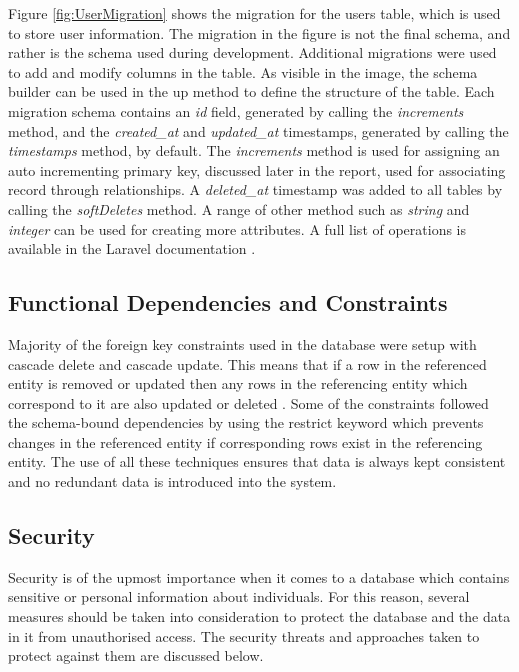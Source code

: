 Figure \ref{fig:UserMigration} shows the migration for the users table, which is used to store user information. The migration in the figure is not the final schema, and rather is the schema used during development. Additional migrations were used to add and modify columns in the table. As visible in the image, the schema builder can be used in the up method to define the structure of the table. Each migration schema contains an \emph{id} field, generated by calling the \emph{increments} method, and the \emph{created\_at} and \emph{updated\_at} timestamps, generated by calling the \emph{timestamps} method, by default. The \emph{increments} method is used for assigning an auto incrementing primary key, discussed later in the report, used for associating record through relationships. A \emph{deleted\_at} timestamp was added to all tables by calling the \emph{softDeletes} method. A range of other method such as \emph{string} and \emph{integer} can be used for creating more attributes. A full list of operations is available in the Laravel documentation \cite{Laravel:Migrations}. 

\subsection{Functional Dependencies and Constraints}
Majority of the foreign key constraints used in the database were setup with cascade delete and cascade update. This means that if a row in the referenced entity is removed or updated then any rows in the referencing entity which correspond to it are also updated or deleted \cite{TechOnTheNet:Cascading}. Some of the constraints followed the schema-bound dependencies by using the restrict keyword which prevents changes in the referenced entity if corresponding rows exist in the referencing entity. The use of all these techniques ensures that data is always kept consistent and no redundant data is introduced into the system.

\subsection{Security}
Security is of the upmost importance when it comes to a database which contains sensitive or personal information about individuals. For this reason, several measures should be taken into consideration to protect the database and the data in it from unauthorised access. The security threats and approaches taken to protect against them are discussed below.

